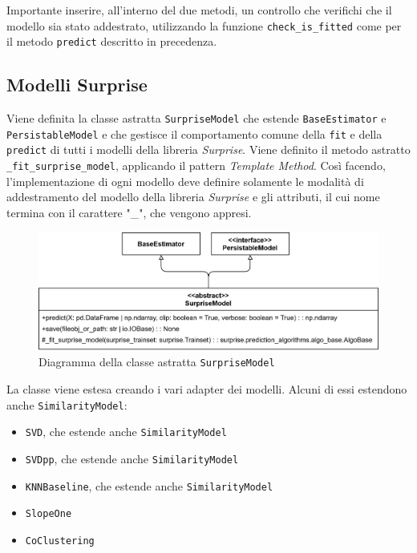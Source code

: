 Importante inserire, all'interno del due metodi, un controllo che verifichi che il modello sia stato addestrato, utilizzando la funzione \texttt{check\_is\_fitted} come per il metodo \texttt{predict} descritto in precedenza.

\subsection{Modelli Surprise}

Viene definita la classe astratta \texttt{SurpriseModel} che estende \texttt{BaseEstimator} e \texttt{PersistableModel} e che gestisce il comportamento comune della \texttt{fit} e della \texttt{predict} di tutti i modelli della libreria \textit{Surprise}. Viene definito il metodo astratto \texttt{\_fit\_surprise\_model}, applicando il pattern \textit{Template Method}. Così facendo, l'implementazione di ogni modello deve definire solamente le modalità di addestramento del modello della libreria \textit{Surprise} e gli attributi, il cui nome termina con il carattere "\_", che vengono appresi.

\begin{figure}[htbp]
    \centering
    \includegraphics[scale=0.17]{figures/UML/models/surprise_model.png}
    \caption{Diagramma della classe astratta \texttt{SurpriseModel}}
\end{figure}

La classe viene estesa creando i vari adapter dei modelli. Alcuni di essi estendono anche \texttt{SimilarityModel}:

\begin{itemize}
    \item \texttt{SVD}, che estende anche \texttt{SimilarityModel}
    \item \texttt{SVDpp}, che estende anche \texttt{SimilarityModel}
    \item \texttt{KNNBaseline}, che estende anche \texttt{SimilarityModel}
    \item \texttt{SlopeOne}
    \item \texttt{CoClustering}
\end{itemize}

